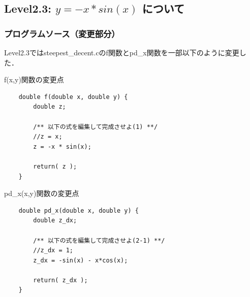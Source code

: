 \subsection{Level2.3: $y=-x*sin(x)$ について}

% 

% 
% 
% 


\subsubsection{プログラムソース（変更部分）}
Level2.3ではsteepest\_decent.cのf関数とpd\_x関数を一部以下のように変更した．
\begin{itembox}[c]{f(x,y)関数の変更点}
    {\small
    \begin{verbatim}
    double f(double x, double y) {
        double z;

        /** 以下の式を編集して完成させよ(1) **/
        //z = x;
        z = -x * sin(x);

        return( z );
    }
    \end{verbatim}
}
\end{itembox}

\begin{itembox}[c]{pd\_x(x,y)関数の変更点}
    {\small
    \begin{verbatim}
    double pd_x(double x, double y) {
        double z_dx;

        /** 以下の式を編集して完成させよ(2-1) **/
        //z_dx = 1;
        z_dx = -sin(x) - x*cos(x);

        return( z_dx );
    }
\end{verbatim}
}
\end{itembox}

